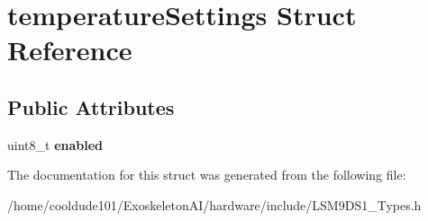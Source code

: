 \hypertarget{structtemperatureSettings}{}\section{temperature\+Settings Struct Reference}
\label{structtemperatureSettings}
\subsection*{Public Attributes}
\begin{DoxyCompactItemize}
\item 
uint8\+\_\+t {\bfseries enabled}\hypertarget{structtemperatureSettings_aeb258e2620d85e2f72fc057dbffa9715}{}\label{structtemperatureSettings_aeb258e2620d85e2f72fc057dbffa9715}

\end{DoxyCompactItemize}


The documentation for this struct was generated from the following file\+:\begin{DoxyCompactItemize}
\item 
/home/cooldude101/\+Exoskeleton\+A\+I/hardware/include/L\+S\+M9\+D\+S1\+\_\+\+Types.\+h\end{DoxyCompactItemize}
